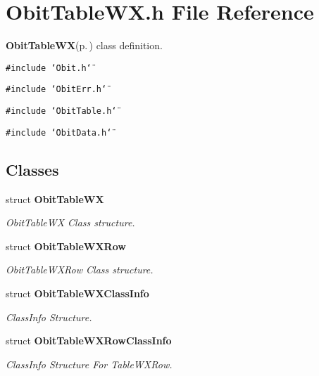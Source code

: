 \section{Obit\-Table\-WX.h File Reference}
\label{ObitTableWX_8h}
{\bf Obit\-Table\-WX}{\rm (p.\,\pageref{structObitTableWX})} class definition. 

{\tt \#include \char`\"{}Obit.h\char`\"{}}\par
{\tt \#include \char`\"{}Obit\-Err.h\char`\"{}}\par
{\tt \#include \char`\"{}Obit\-Table.h\char`\"{}}\par
{\tt \#include \char`\"{}Obit\-Data.h\char`\"{}}\par
\subsection*{Classes}
\begin{CompactItemize}
\item 
struct {\bf Obit\-Table\-WX}
\begin{CompactList}\small\item\em Obit\-Table\-WX Class structure. \item\end{CompactList}\item 
struct {\bf Obit\-Table\-WXRow}
\begin{CompactList}\small\item\em Obit\-Table\-WXRow Class structure. \item\end{CompactList}\item 
struct {\bf Obit\-Table\-WXClass\-Info}
\begin{CompactList}\small\item\em Class\-Info Structure. \item\end{CompactList}\item 
struct {\bf Obit\-Table\-WXRow\-Class\-Info}
\begin{CompactList}\small\item\em Class\-Info Structure For Table\-WXRow. \item\end{CompactList}\end{CompactItemize}
